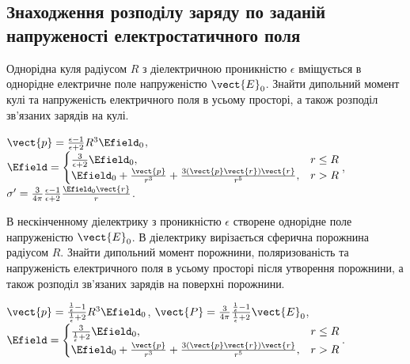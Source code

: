 \subsection*{Знаходження розподілу заряду по заданій напруженості електростатичного поля}

\begin{problem}\label{FieldInDielectricSphere}
Однорідна куля радіусом $R$ з діелектричною проникністю $\epsilon$ вміщується в однорідне електричне поле напруженістю $\vect{E}_0$. Знайти дипольний момент кулі та напруженість електричного поля в усьому просторі, а також розподіл зв'язаних зарядів на кулі.
\begin{solution}
	$\vect{p} = \frac{\epsilon - 1}{\epsilon + 2}R^3\Efield_0$,
	$
		\Efield =
		\begin{cases}
			\frac{3}{\epsilon + 2} \Efield_0,                                                       & r \le R \\
			\Efield_0 + \frac{\vect{p}}{r^3} + \frac{3\left(\vect{p}\vect{r}\right)\vect{r} }{r^5}, & r > R
		\end{cases}
	$,
	$\sigma' = \frac{3}{4\pi} \frac{\epsilon - 1}{\epsilon + 2} \frac{\Efield_0\vect{r}}{r}$.
\end{solution}
\end{problem}

\begin{problem}\label{FieldInDielectricHole}
В нескінченному діелектрику з проникністю $\epsilon$ створене однорідне поле напруженістю $\vect{E}_0$. В діелектрику вирізається сферична порожнина радіусом $R$. Знайти дипольний момент порожнини, поляризованість та напруженість електричного поля в усьому просторі після утворення порожнини, а також розподіл зв'язаних зарядів на поверхні порожнини.
\begin{solution}
	$\vect{p} = \frac{\frac{1}{\epsilon} - 1}{\frac{1}{\epsilon} + 2}R^3\Efield_0$,
	$\vect{P} = \frac{3}{4\pi} \frac{\frac{1}{\epsilon} - 1}{\frac{1}{\epsilon} + 2} \vect{E}_0$,
	$
		\Efield =
		\begin{cases}
			\frac{3}{\frac{1}{\epsilon} + 2} \Efield_0,                                             & r \le R \\
			\Efield_0 + \frac{\vect{p}}{r^3} + \frac{3\left(\vect{p}\vect{r}\right)\vect{r} }{r^5}, & r > R
		\end{cases}
	$.
\end{solution}
\end{problem}

